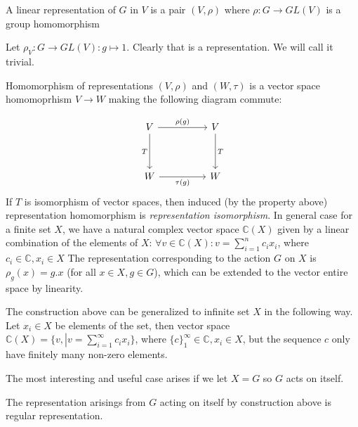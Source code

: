 \documentclass{amsart}
\begin{document}
 
    \begin{definition}
        A linear representation of $G$ in $V$ is a pair $(V, \rho)$ where $\rho: G \to GL(V)$ is a group homomorphism
    \end{definition}

    \begin{example}
        Let $\rho_V : G \to GL(V): g \mapsto 1$.
        Clearly that is a representation. We will call it trivial.
    \end{example}

    \begin{definition}
        Homomorphism of representations $(V, \rho)$ and $(W, \tau)$ is a vector space homomoprhism $V \to W$ making the following diagram commute:
    \end{definition}
    \[\begin{tikzcd}
        V && V \\
        \\
        W && W
        \arrow["{\rho(g)}", from=1-1, to=1-3]
        \arrow["T", from=1-3, to=3-3]
        \arrow["T"', from=1-1, to=3-1]
        \arrow["{\tau(g)}"', from=3-1, to=3-3]
    \end{tikzcd}\]
    If $T$ is isomorphism of vector spaces, then induced (by the property above) representation homomorphism is \textit{representation isomorphism}. 
    In general case for a finite set $X$, we have a natural complex vector space $\mathbb{C}(X)$ given by a linear combination of the elements of $X$:
$\forall v \in \mathbb{C}(X): v = \sum_{i=1}^n c_i x_i$, where $c_i \in \mathbb{C}, x_i \in X$
The representation corresponding to the action $G$ on $X$ is $\rho_g (x) = g . x$ (for all $x\in X, g \in G$), which can be extended to the vector entire space by linearity.

\begin{note}
    The construction above can be generalized to infinite set $X$ in the following way.
    Let $x_i \in X$ be elements of the set, 
    then vector space $\mathbb{C}(X)=\{ v, \left. \right| v = \sum_{i=1}^\infty c_i x_i\}$, where $ \{c\}_1^\infty \in \mathbb{C}, x_i \in X$, 
    but the sequence $c$ only have finitely many non-zero elements.
\end{note}

The most interesting and useful case arises if we let $X = G$ so $G$ acts on itself.

\begin{definition}
The representation arisings from $G$ acting on itself by construction above is regular representation.
\end{definition}
\end{document}
